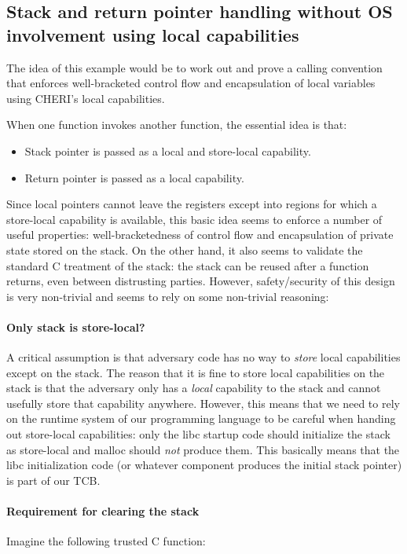 \documentclass[a4paper]{article}
\begin{document}
\subsection{Stack and return pointer handling without OS involvement using local
  capabilities}
The idea of this example would be to work out and prove a calling convention
that enforces well-bracketed control flow and encapsulation of local variables
using CHERI's local capabilities.

When one function invokes another function, the essential idea is that:
\begin{itemize}
\item Stack pointer is passed as a local and store-local capability.
\item Return pointer is passed as a local capability.
\end{itemize}

Since local pointers cannot leave the registers except into regions for which a
store-local capability is available, this basic idea seems to enforce a number
of useful properties: well-bracketedness of control flow and encapsulation of
private state stored on the stack. On the other hand, it also seems to validate
the standard C treatment of the stack: the stack can be reused after a function
returns, even between distrusting parties. However, safety/security of this
design is very non-trivial and seems to rely on some non-trivial reasoning:

\paragraph{Only stack is store-local?}
A critical assumption is that adversary code has no way to \emph{store} local
capabilities except on the stack. The reason that it is fine to store local
capabilities on the stack is that the adversary only has a \emph{local}
capability to the stack and cannot usefully store that capability anywhere.
However, this means that we need to rely on the runtime system of our
programming language to be careful when handing out store-local capabilities:
only the libc startup code should initialize the stack as store-local and malloc
should \emph{not} produce them. This basically means that the libc
initialization code (or whatever component produces the initial stack pointer)
is part of our TCB.

\paragraph{Requirement for clearing the stack}
Imagine the following trusted C function:
\end{document}
